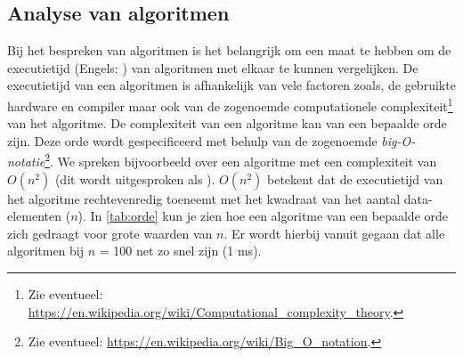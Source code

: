 \begin{cpplstShortInline}
\section{Analyse van algoritmen}
\label{sec:analysevanalgoritmen}
Bij het bespreken van algoritmen is het belangrijk om een maat te hebben om de executietijd (Engels: ) van algoritmen met elkaar te kunnen vergelijken.
De executietijd van een algoritmen is afhankelijk van vele factoren zoals, de gebruikte hardware en compiler maar ook van de zogenoemde computationele complexiteit\footnote{%
	Zie eventueel: \url{https://en.wikipedia.org/wiki/Computational_complexity_theory}.
} van het algoritme.
De complexiteit van een algoritme kan van een bepaalde orde zijn.
Deze orde wordt gespecificeerd met behulp van de zogenoemde \emph{big-O-notatie}\footnote{%
	Zie eventueel: \url{https://en.wikipedia.org/wiki/Big_O_notation}.
}.
We spreken bijvoorbeeld over een algoritme met een complexiteit van $O(n^2)$ (dit wordt uitgesproken als ).
$O(n^2)$ betekent dat de executietijd van het algoritme rechtevenredig toeneemt met het kwadraat van het aantal data\hyp{}elementen ($n$).
In \cref{tab:orde} kun je zien hoe een algoritme van een bepaalde orde zich gedraagt voor grote waarden van $n$.
Er wordt hierbij vanuit gegaan dat alle algoritmen bij $n$ = 100 net zo snel zijn (1 ms).



\end{cpplstShortInline}
